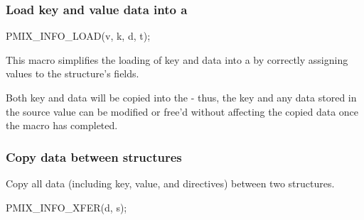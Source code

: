 \begin{arglist}
\end{arglist}

\subsubsection{Load key and value data into a }

\cspecificstart
\begin{codepar}
PMIX_INFO_LOAD(v, k, d, t);
\end{codepar}
\cspecificend

\begin{arglist}
\end{arglist}

This macro simplifies the loading of key and data into a  by correctly assigning values to the structure's fields.

\adviceuserstart
Both key and data will be copied into the  - thus, the key and any data stored in the source value can be modified or free'd without affecting the copied data once the macro has completed.
\adviceuserend

\subsubsection{Copy data between  structures}

Copy all data (including key, value, and directives) between two  structures.

\cspecificstart
\begin{codepar}
PMIX_INFO_XFER(d, s);
\end{codepar}
\cspecificend

\begin{arglist}
\end{arglist}

